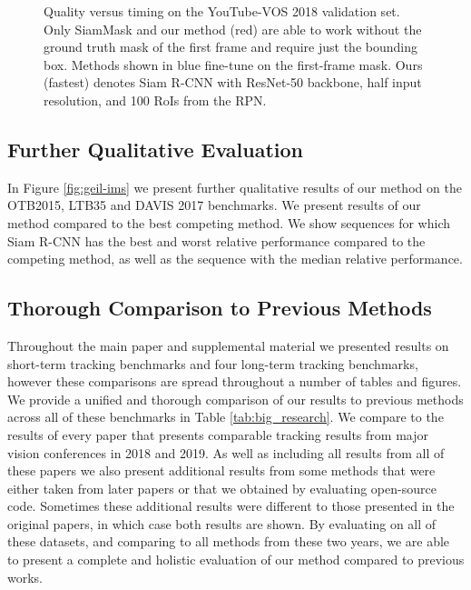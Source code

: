 \documentclass[10pt,twocolumn,letterpaper]{article}
\begin{document}
\begin{figure}
{}
\vspace{-5mm}
   \caption{Quality versus timing on the YouTube-VOS 2018 \cite{Xu18ECCV} validation set. Only SiamMask \cite{Wang19CVPR} and our method (red) are able to work without the ground truth mask of the first frame and require just the bounding box. Methods shown in blue fine-tune on the first-frame mask. Ours (fastest) denotes Siam R-CNN with ResNet-50 backbone, half input resolution, and 100 RoIs from the RPN.}
   \label{fig:speedplot-ytbvos}
   \vspace{-1mm}
\end{figure}
 


\subsection{Further Qualitative Evaluation}
In Figure \ref{fig:geil-ims} we present further qualitative results of our method on the OTB2015, LTB35 and DAVIS 2017 benchmarks. We present results of our method compared to the best competing method. We show sequences for which Siam R-CNN has the best and worst relative performance compared to the competing method, as well as the sequence with the median relative performance. 

\subsection{Thorough Comparison to Previous Methods}
Throughout the main paper and supplemental material we presented results on  short-term tracking benchmarks and four long-term tracking benchmarks, however these comparisons are spread throughout a number of tables and figures. We provide a unified and thorough comparison of our results to previous methods across all of these benchmarks in Table \ref{tab:big_research}. We compare to the results of every paper that presents comparable tracking results from major vision conferences in 2018 and 2019. As well as including all results from all of these papers we also present additional results from some methods that were either taken from later papers or that we obtained by evaluating open-source code. Sometimes these additional results were different to those presented in the original papers, in which case both results are shown. By evaluating on all of these datasets, and comparing to all methods from these two years, we are able to present a complete and holistic evaluation of our method compared to previous works.
\end{document}
